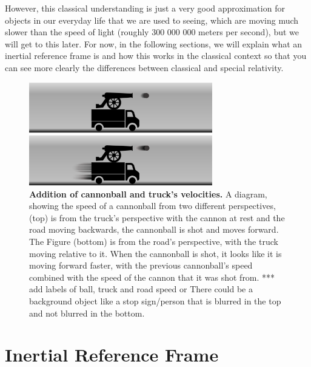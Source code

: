 However, this classical understanding is just a very good approximation for objects in our everyday life that we are used to seeing, which are moving much slower than the speed of light (roughly 300 000 000 meters per second), but we will get to this later.
For now, in the following sections, we will explain what an inertial reference frame is and how this works in the classical context so that you can see more clearly the differences between classical and special relativity.

\begin{figure}[H]
	\centering
	\includegraphics[width = 8cm]{images/pdf/lorry_cannonball.pdf}
	\caption{\textbf{Addition of cannonball and truck's velocities.} A diagram, showing the speed of a cannonball from two different perspectives, (top) is from the truck's perspective with the cannon at rest and the road moving backwards, the cannonball is shot and moves forward. The Figure (bottom) is from the road's perspective, with the truck moving relative to it. When the cannonball is shot, it looks like it is moving forward faster, with the previous cannonball's speed combined with the speed of the cannon that it was shot from. *** add labels of ball, truck and road speed or There could be a background object like a stop sign/person that is blurred in the top and not blurred in the bottom.}
	\label{fig: truck cannonball}
\end{figure}

\section{Inertial Reference Frame} \label{sect: Inertial Reference Frame}

